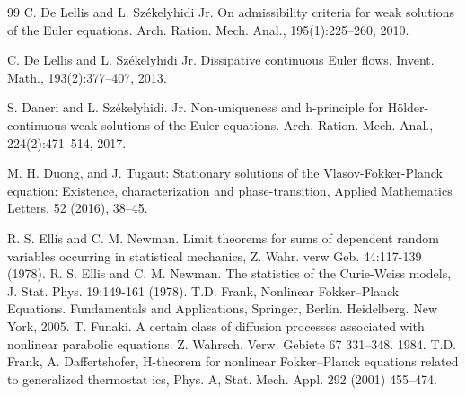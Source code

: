 \documentclass[UTF-8,reqno]{amsart}
\numberwithin{equation}{section}
\theoremstyle{definition}
\begin{document}
\begin{thebibliography}{99}
C. De Lellis and L. Sz{\'e}kelyhidi Jr. On admissibility criteria for weak solutions of the Euler equations.
Arch. Ration. Mech. Anal., 195(1):225–260, 2010.

C. De Lellis and L. Sz{\'e}kelyhidi Jr. Dissipative continuous Euler flows. Invent. Math., 193(2):377–407,
2013.

S. Daneri and L. Sz\'ekelyhidi. Jr. Non-uniqueness and h-principle for H\"older-continuous weak solutions of the 
Euler equations. Arch. Ration. Mech. Anal., 224(2):471–514, 2017.

M. H.  Duong, and J. Tugaut: Stationary solutions of the Vlasov-Fokker-Planck equation:
Existence, characterization and phase-transition, Applied Mathematics Letters, 52 (2016),
38–45. 

 R. S. Ellis and C. M. Newman. Limit theorems for sums of dependent random variables 
occurring in statistical mechanics, Z. Wahr. verw Geb. 44:117-139 (1978). 
  R. S. Ellis and C. M. Newman. The statistics of the Curie-Weiss models, J. Stat. Phys. 
19:149-161 (1978). 
 T.D. Frank, Nonlinear Fokker–Planck Equations. Fundamentals and Applications, Springer, Berlin. Heidelberg. 
New York, 2005.
T.  Funaki.  A certain class of diffusion processes associated with nonlinear parabolic equations. Z.
Wahrsch. Verw. Gebiete 67 331–348. 1984.
 T.D. Frank, A. Daffertshofer, H-theorem for nonlinear Fokker–Planck equations related to generalized thermostat
ics, Phys. A, Stat. Mech. Appl. 292 (2001) 455–474.


\end{thebibliography}
\end{document}
